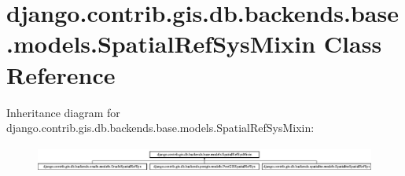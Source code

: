 \hypertarget{classdjango_1_1contrib_1_1gis_1_1db_1_1backends_1_1base_1_1models_1_1_spatial_ref_sys_mixin}{}\section{django.\+contrib.\+gis.\+db.\+backends.\+base.\+models.\+Spatial\+Ref\+Sys\+Mixin Class Reference}
\label{classdjango_1_1contrib_1_1gis_1_1db_1_1backends_1_1base_1_1models_1_1_spatial_ref_sys_mixin}
Inheritance diagram for django.\+contrib.\+gis.\+db.\+backends.\+base.\+models.\+Spatial\+Ref\+Sys\+Mixin\+:\begin{figure}[H]
\begin{center}
\leavevmode
\includegraphics[height=0.876369cm]{classdjango_1_1contrib_1_1gis_1_1db_1_1backends_1_1base_1_1models_1_1_spatial_ref_sys_mixin}
\end{center}
\end{figure}
